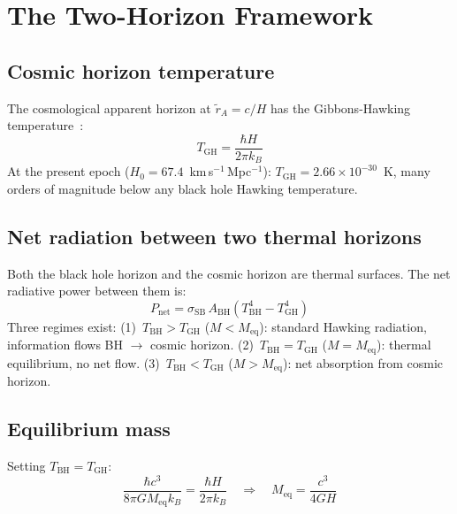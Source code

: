 \documentclass[12pt,a4paper]{article}
\begin{document}
\section{The Two-Horizon Framework}

\subsection{Cosmic horizon temperature}

The cosmological apparent horizon at $\tilde{r}_A = c/H$ has the Gibbons-Hawking
temperature~\citep{GibbonsHawking1977}:
\begin{equation}
T_\mathrm{GH} = \frac{\hbar H}{2\pi k_B}
\end{equation}
At the present epoch ($H_0 = 67.4$~km\,s$^{-1}$\,Mpc$^{-1}$):
$T_\mathrm{GH} = 2.66 \times 10^{-30}$~K, many orders of magnitude below any
black hole Hawking temperature.

\subsection{Net radiation between two thermal horizons}

Both the black hole horizon and the cosmic horizon are thermal surfaces. The net
radiative power between them is:
\begin{equation}
P_\mathrm{net} = \sigma_\mathrm{SB}\, A_\mathrm{BH}
\left(T_\mathrm{BH}^4 - T_\mathrm{GH}^4\right)
\end{equation}
Three regimes exist: (1)~$T_\mathrm{BH} > T_\mathrm{GH}$ ($M < M_\mathrm{eq}$):
standard Hawking radiation, information flows BH $\to$ cosmic horizon.
(2)~$T_\mathrm{BH} = T_\mathrm{GH}$ ($M = M_\mathrm{eq}$): thermal equilibrium,
no net flow. (3)~$T_\mathrm{BH} < T_\mathrm{GH}$ ($M > M_\mathrm{eq}$): net
absorption from cosmic horizon.

\subsection{Equilibrium mass}

Setting $T_\mathrm{BH} = T_\mathrm{GH}$:
\begin{equation}
\frac{\hbar c^3}{8\pi G M_\mathrm{eq} k_B} = \frac{\hbar H}{2\pi k_B}
\quad\Rightarrow\quad
M_\mathrm{eq} = \frac{c^3}{4GH}
\label{eq:Meq}
\end{equation}
\end{document}
